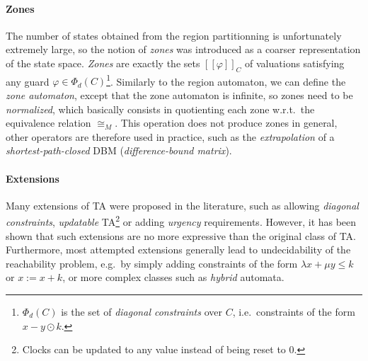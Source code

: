 \documentclass[11pt]{article}
\theoremstyle{definition}
\theoremstyle{remark}
\theoremstyle{definition}
\begin{document}
\paragraph{Zones} \label{par:zones}
The number of states obtained from the region partitionning is unfortunately extremely large, so the notion of \emph{zones} was introduced as a coarser representation of the state space. \emph{Zones} are exactly the sets $[\![\varphi]\!]_C$ of valuations satisfying any guard $\varphi \in \Phi_d(C)$\footnote{$\Phi_d(C)$ is the set of \emph{diagonal constraints} over $C$, i.e.\ constraints of the form $x - y \odot k$.}.
Similarly to the region automaton, we can define the \emph{zone automaton}, except that the zone automaton is infinite, so zones need to be \emph{normalized}, which basically consists in quotienting each zone w.r.t.\ the equivalence relation $\cong_M$. This operation does not produce zones in general, other operators are therefore used in practice, such as the \emph{extrapolation} of a \emph{shortest-path-closed} DBM (\emph{difference-bound matrix}).





\paragraph{Extensions}\label{par:ta_ext}
Many extensions of TA were proposed in the literature, such as allowing \emph{diagonal constraints}, \emph{updatable} TA\footnote{Clocks can be updated to any value instead of being reset to 0.} or adding \emph{urgency} requirements. However, it has been shown that such extensions are no more expressive than the original class of TA. Furthermore, most attempted extensions generally lead to undecidability of the reachability problem, e.g.\ by simply adding constraints of the form $\lambda x + \mu y \leq k$ or $x := x + k$, or more complex classes such as \emph{hybrid} automata.
\end{document}
